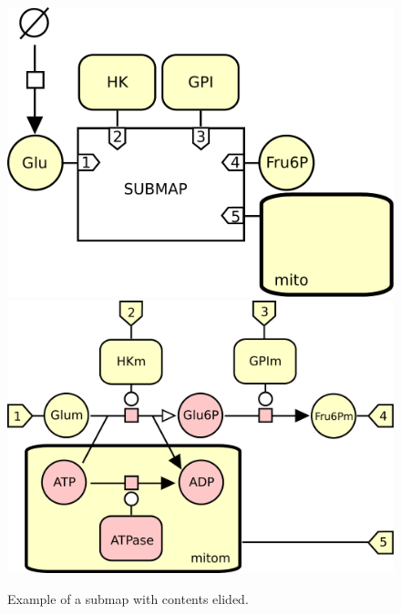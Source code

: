 \begin{figure}[htb]
  \centering
  \includegraphics[scale = 0.4]{le_images/submap-folded}
  \includegraphics[scale = 0.35]{le_images/submap-unfolded}
  \caption{Example of a submap with contents elided.}
  \label{fig:submap-folded}
\end{figure}


%
%
% 
%
%
%
